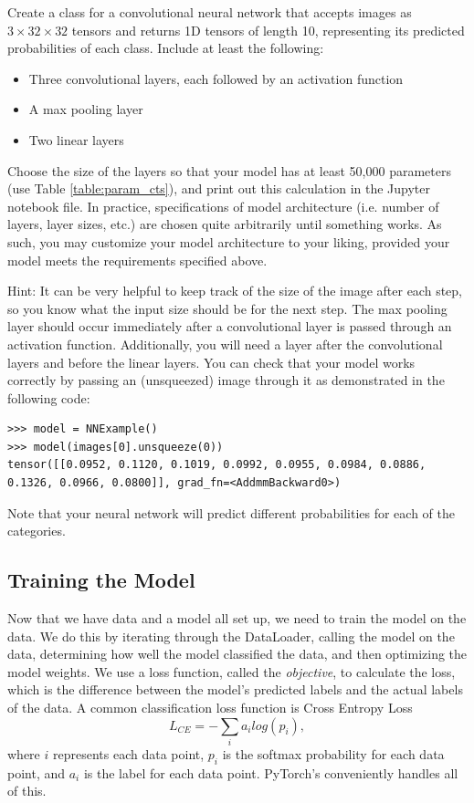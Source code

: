 \begin{problem}
Create a class for a convolutional neural network that accepts images as \(3\times32\times32\) tensors and returns 1D tensors of length 10, representing its predicted probabilities of each class.
Include at least the following:
\begin{itemize}
	\item Three convolutional layers, each followed by an activation function
	\item A max pooling layer
	\item Two linear layers
\end{itemize}
Choose the size of the layers so that your model has at least 50,000 parameters (use Table \ref{table:param_cts}), and print out this calculation in the Jupyter notebook file.
In practice, specifications of model architecture (i.e. number of layers, layer sizes, etc.) are chosen quite arbitrarily until something works.
As such, you may customize your model architecture to your liking, provided your model meets the requirements specified above.

Hint: It can be very helpful to keep track of the size of the image after each step, so you know what the input size should be for the next step.
The max pooling layer should occur immediately after a convolutional layer is passed through an activation function.
Additionally, you will need a  layer after the convolutional layers and before the linear layers.
You can check that your model works correctly by passing an (unsqueezed) image through it as demonstrated in the following code:

\begin{lstlisting}
>>> model = NNExample()
>>> model(images[0].unsqueeze(0))
tensor([[0.0952, 0.1120, 0.1019, 0.0992, 0.0955, 0.0984, 0.0886, 0.1326, 0.0966, 0.0800]], grad_fn=<AddmmBackward0>)
\end{lstlisting}
Note that your neural network will predict different probabilities for each of the categories.

\end{problem}

\subsection*{Training the Model}
Now that we have data and a model all set up, we need to train the model on the data.
We do this by iterating through the DataLoader, calling the model on the data, determining how well the model classified the data, and then optimizing the model weights.
We use a loss function, called the \emph{objective}, to calculate the loss, which is the difference between the model's predicted labels and the actual labels of the data.
A common classification loss function is Cross Entropy Loss
\begin{equation*}
    L_{CE} = -\sum_i a_i log(p_i),
    \label{eq:cel}
\end{equation*}
where $i$ represents each data point, $p_i$ is the softmax probability for each data point, and $a_i$ is the label for each data point.
PyTorch's  conveniently handles all of this.

